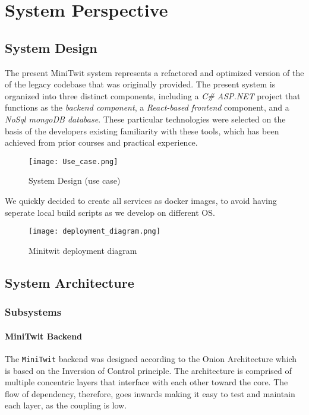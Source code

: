 \chapter{System Perspective}

\section{System Design}
The present MiniTwit system represents a refactored and optimized version of the of the legacy codebase that was originally provided. The present system is organized into three distinct components, including a \textit{C\# ASP.NET} project that functions as the \textit{backend component}, a \textit{React-based frontend} component, and a \textit{NoSql mongoDB database}. These particular technologies were selected on the basis of the developers existing familiarity with these tools, which has been achieved from prior courses and practical experience. 

\begin{figure}[H]
    \centering
    \texttt{[image: Use\_case.png]}
    \caption{System Design (use case)}
    \label{fig:use_case_diagram}
\end{figure}

We quickly decided to create all services as docker images, to avoid having seperate local build scripts as we develop on different OS.


\begin{figure}[H]
    \centering
    \texttt{[image: deployment\_diagram.png]}
    \caption{Minitwit deployment diagram}
    \label{fig:deployment_diagram}
\end{figure}

\section{System Architecture}

\subsection{Subsystems} \label{sec:subsystems}

\subsubsection{MiniTwit Backend}

The \texttt{MiniTwit} backend was designed according to the Onion Architecture which is based on the Inversion of Control principle. The architecture is comprised of multiple concentric layers that interface with each other toward the core. The flow of dependency, therefore, goes inwards making it easy to test and maintain each layer, as the coupling is low.

